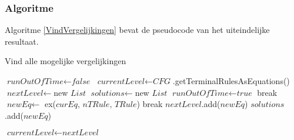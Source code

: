 \documentclass[Main.tex]{subfiles}
\begin{document}
\subsubsection*{Algoritme} \label{ssection:algorimteBesprekeing}
Algoritme \ref{VindVergelijkingen} bevat de pseudocode van het uiteindelijke resultaat.
\begin{algorithm}[!htb]
\caption{Vind alle mogelijke vergelijkingen}
\label{VindVergelijkingen}
\begin{algorithmic}[1]
\State $\textit{runOutOfTime} \gets \textit{false}$
\State $\textit{currentLevel} \gets \textit{CFG}$.getTerminalRulesAsEquations()
\State $\textit{nextLevel} \gets$new $\textit{List}$
\State $\textit{solutions} \gets$new $\textit{List}$
			\State $\textit{runOutOfTime} \gets \textit{true}$
			\State break
		\EndIf
				\State $\textit{newEq} \gets$ ex($\textit{curEq, nTRule, TRule}$)
					\State break
					\State $\textit{nextLevel}$.add($\textit{newEq}$)
						\State $\textit{solutions}$.add($\textit{newEq}$)
					\EndIf
				\EndIf

			\EndFor
		\EndFor
	\EndFor
	\State $\textit{currentLevel} \gets \textit{nextLevel}$
\EndWhile
\EndProcedure
\end{algorithmic}
\end{algorithm}
\end{document}
